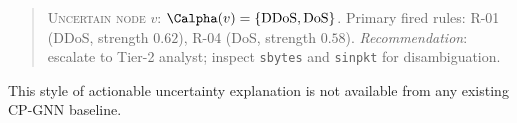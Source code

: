 \begin{quote}
\textsc{Uncertain node $v$:} $\Calpha(v) = \{\text{DDoS}, \text{DoS}\}$.
Primary fired rules: R-01 (DDoS, strength $0.62$), R-04 (DoS, strength $0.58$).
\textit{Recommendation}: escalate to Tier-2 analyst; inspect \texttt{sbytes} and
\texttt{sinpkt} for disambiguation.
\end{quote}

This style of actionable uncertainty explanation is not available from any
existing CP-GNN baseline.
